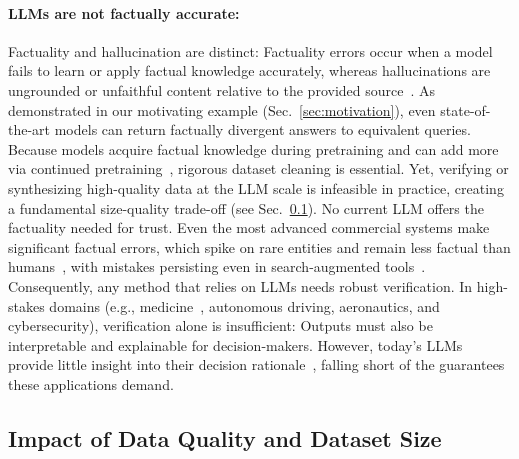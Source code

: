 \documentclass[10pt]{article}
\begin{document}
\paragraph{LLMs are not factually accurate:} Factuality and hallucination are distinct: Factuality errors occur when a model fails to learn or apply factual knowledge accurately, whereas hallucinations are ungrounded or unfaithful content relative to the provided source~\cite{2024-factuality}. As demonstrated in our motivating example (Sec.~\ref{sec:motivation}), even state-of-the-art models can return factually divergent answers to equivalent queries. Because models acquire factual knowledge during pretraining and can add more via continued pretraining~\cite{fact_knowledge_pretrain}, rigorous dataset cleaning is essential. Yet, verifying or synthesizing high-quality data at the LLM scale is infeasible in practice, creating a fundamental size-quality trade-off (see Sec.~\ref{subsec:impact_of_data}). No current LLM offers the factuality needed for trust. Even the most advanced commercial systems make significant factual errors, which spike on rare entities and remain less factual than humans~\cite{min-factscore}, with mistakes persisting even in search-augmented tools~\cite{wired_perplexity_2024}. Consequently, any method that relies on LLMs needs robust verification. In high-stakes domains (e.g., medicine~\cite{Thirunavukarasu2023LLM}, autonomous driving, aeronautics, and cybersecurity), verification alone is insufficient: Outputs must also be interpretable and explainable for decision-makers. However, today's LLMs provide little insight into their decision rationale~\cite{madsen-etal-2024-self, osti_10380030, bowman2023thingsknowlargelanguage}, falling short of the guarantees these applications demand.

\subsection{Impact of Data Quality and Dataset Size}
\label{subsec:impact_of_data}
\end{document}
